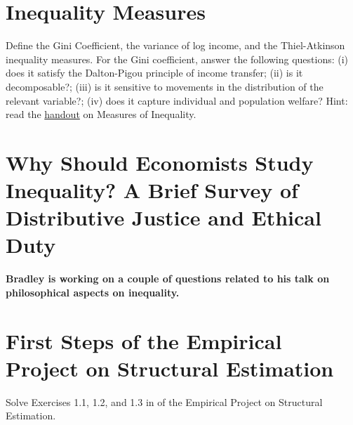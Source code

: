 \section{Inequality Measures}
\noindent Define the Gini Coefficient, the variance of log income, and the Thiel-Atkinson inequality measures. For the Gini coefficient, answer the following questions: (i) does it satisfy the Dalton-Pigou principle of income transfer; (ii) is it decomposable?; (iii) is it sensitive to movements in the distribution of the relevant variable?; (iv) does it capture individual and population welfare? Hint: read the \href{http://jenni.uchicago.edu/econ350/ta_notes/archive_2010/Inequality_TA111.pdf}{handout} on Measures of Inequality.


\section{Why Should Economists Study Inequality? A Brief Survey of Distributive Justice and Ethical Duty}
\textbf{Bradley is working on a couple of questions related to his talk on philosophical aspects on inequality.}


\section{First Steps of the Empirical Project on Structural Estimation}
Solve Exercises 1.1, 1.2, and 1.3 in of the Empirical Project on Structural Estimation.
%
%





